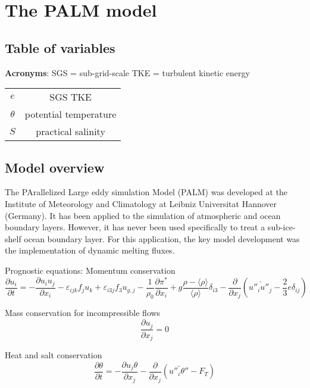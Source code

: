 \documentclass[letterpaper,10pt]{report}
\begin{document}
\chapter{The PALM model}
    \section{Table of variables}
    
    \textbf{Acronyms}:
    SGS = sub-grid-scale
    TKE = turbulent kinetic energy
    
    \begin{tabular}{c|c}
       $e$      & SGS TKE \\
       $\theta$ & potential temperature \\
       $S$      & practical salinity
    \end{tabular}
	\section{Model overview}
	
	The PArallelized Large eddy simulation Model (PALM) was developed at the Institute of Meteorology and Climatology at Leibniz Universitat Hannover (Germany). It has been applied to the simulation of atmospheric and ocean boundary layers. However, it has never been used specifically to treat a sub-ice-shelf ocean boundary layer. For this application, the key model development was the implementation of dynamic melting fluxes. 
	
	Prognostic equations:
	Momentum conservation
	\begin{equation} \label{eq:uprog}
	\frac{\partial u_i}{\partial t} = -\frac{\partial u_i u_j}{\partial x_i}-\varepsilon_{ijk} f_j u_k + \varepsilon_{i3j} f_3 u_{g,j} - \frac{1}{\rho_0}\frac{\partial \pi^*}{\partial x_i} + g \frac{\rho - \langle \rho \rangle}{\langle \rho \rangle}\delta_{i3} - \frac{\partial}{\partial x_j}(\bar{u''_i u''_j} - \frac{2}{3}e\delta_{ij})
	\end{equation}
	
	Mass conservation for incompressible flows
	\begin{equation} \label{eq:volconserv}
	\frac{\partial u_j}{\partial x_j} = 0
	\end{equation}
	
	Heat and salt conservation
	\begin{equation} \label{eq:ptprog}
	\frac{\partial \theta}{\partial t} = -\frac{\partial u_j \theta}{\partial x_j} - \frac{\partial}{\partial x_j}(\bar{u''_i \theta''} - F_T)
	\end{equation}
	
\end{document}
